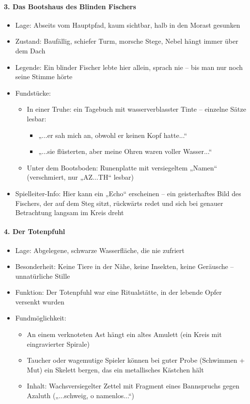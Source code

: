 \paragraph{3. Das Bootshaus des Blinden Fischers}
\begin{itemize}
\item Lage: Abseits vom Hauptpfad, kaum sichtbar, halb in den Morast gesunken
\item Zustand: Baufällig, schiefer Turm, morsche Stege, Nebel hängt immer über dem Dach
\item Legende: Ein blinder Fischer lebte hier allein, sprach nie – bis man nur noch seine Stimme hörte
\item Fundstücke:  
	\begin{itemize}
    \item In einer Truhe: ein Tagebuch mit wasserverblasster Tinte – einzelne Sätze lesbar:
		\begin{itemize}
         \item „...er sah mich an, obwohl er keinen Kopf hatte...“
         \item „...sie flüsterten, aber meine Ohren waren voller Wasser...“
		\end{itemize}
    \item Unter dem Bootsboden: Runenplatte mit versiegeltem „Namen“ (verschmiert, nur „AZ...TH“ lesbar)
	\end{itemize}
\item Spielleiter-Info: Hier kann ein „Echo“ erscheinen – ein geisterhaftes Bild des Fischers, der auf dem Steg sitzt, rückwärts redet und sich bei genauer Betrachtung langsam im Kreis dreht
\end{itemize}

\paragraph{4. Der Totenpfuhl}
\begin{itemize}
\item Lage: Abgelegene, schwarze Wasserfläche, die nie zufriert
\item Besonderheit: Keine Tiere in der Nähe, keine Insekten, keine Geräusche – unnatürliche Stille
\item Funktion: Der Totenpfuhl war eine Ritualstätte, in der lebende Opfer versenkt wurden
\item Fundmöglichkeit:
	\begin{itemize}
    \item An einem verknoteten Ast hängt ein altes Amulett (ein Kreis mit eingravierter Spirale)
    \item Taucher oder wagemutige Spieler können bei guter Probe (Schwimmen + Mut) ein Skelett bergen, das ein metallisches Kästchen hält
    \item Inhalt: Wachsversiegelter Zettel mit Fragment eines Bannspruchs gegen Azaluth („...schweig, o namenlos...“)
	\end{itemize}
\end{itemize}

